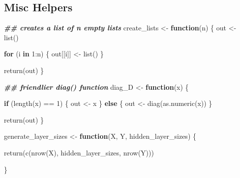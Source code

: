 \documentclass[
]{book}
\newenvironment{Shaded}{\begin{snugshade}}{\end{snugshade}}
\newcommand{\ControlFlowTok}[1]{\textcolor[rgb]{0.13,0.29,0.53}{\textbf{#1}}}
\newcommand{\DecValTok}[1]{\textcolor[rgb]{0.00,0.00,0.81}{#1}}
\newcommand{\DocumentationTok}[1]{\textcolor[rgb]{0.56,0.35,0.01}{\textbf{\textit{#1}}}}
\newcommand{\FunctionTok}[1]{\textcolor[rgb]{0.00,0.00,0.00}{#1}}
\newcommand{\NormalTok}[1]{#1}
\newcommand{\OtherTok}[1]{\textcolor[rgb]{0.56,0.35,0.01}{#1}}
\newcommand{\SpecialCharTok}[1]{\textcolor[rgb]{0.00,0.00,0.00}{#1}}
\begin{document}
\hypertarget{misc-helpers}{%
\subsection{Misc Helpers}\label{misc-helpers}}

\begin{Shaded}
\begin{Highlighting}[]
\DocumentationTok{\#\# creates a list of n empty lists}
\NormalTok{create\_lists }\OtherTok{\textless{}{-}} \ControlFlowTok{function}\NormalTok{(n) \{}
\NormalTok{  out }\OtherTok{\textless{}{-}} \FunctionTok{list}\NormalTok{()}
  
  \ControlFlowTok{for}\NormalTok{ (i }\ControlFlowTok{in} \DecValTok{1}\SpecialCharTok{:}\NormalTok{n) \{}
\NormalTok{    out[[i]] }\OtherTok{\textless{}{-}} \FunctionTok{list}\NormalTok{()}
\NormalTok{  \}}
  
  \FunctionTok{return}\NormalTok{(out)}
\NormalTok{\}}

\DocumentationTok{\#\# friendlier diag() function}
\NormalTok{diag\_D }\OtherTok{\textless{}{-}} \ControlFlowTok{function}\NormalTok{(x) \{}
  
  \ControlFlowTok{if}\NormalTok{ (}\FunctionTok{length}\NormalTok{(x) }\SpecialCharTok{==} \DecValTok{1}\NormalTok{) \{}
\NormalTok{        out }\OtherTok{\textless{}{-}}\NormalTok{ x}
\NormalTok{      \} }\ControlFlowTok{else}\NormalTok{ \{}
\NormalTok{        out }\OtherTok{\textless{}{-}} \FunctionTok{diag}\NormalTok{(}\FunctionTok{as.numeric}\NormalTok{(x))}
\NormalTok{      \}}
  
  \FunctionTok{return}\NormalTok{(out)}
\NormalTok{\}}

\NormalTok{generate\_layer\_sizes }\OtherTok{\textless{}{-}} \ControlFlowTok{function}\NormalTok{(X,}
\NormalTok{                                 Y,}
\NormalTok{                                 hidden\_layer\_sizes) \{}
  
  \FunctionTok{return}\NormalTok{(}\FunctionTok{c}\NormalTok{(}\FunctionTok{nrow}\NormalTok{(X), hidden\_layer\_sizes, }\FunctionTok{nrow}\NormalTok{(Y)))}
  
\NormalTok{\}}
\end{Highlighting}
\end{Shaded}
\end{document}
